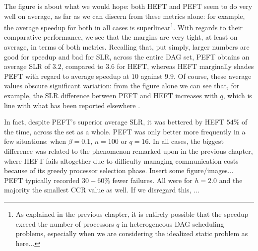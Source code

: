 \documentclass[12pt]{article}
\begin{document}
      The figure is about what we would hope: both HEFT and PEFT seem to do very well on average, as far as we can discern from these metrics alone: for example, the average speedup for both in all cases is superlinear\footnote{As explained in the previous chapter, it is entirely possible that the speedup exceed the number of processors $q$ in heterogeneous DAG scheduling problems, especially when we are considering the idealized static problem as here...}. With regards to their comparative performance, we see that the margins are very tight, at least on average, in terms of both metrics. Recalling that, put simply, larger numbers are good for speedup and bad for SLR, across the entire DAG set, PEFT obtains an average SLR of $3.2$, compared to $3.6$ for HEFT, whereas HEFT marginally shades PEFT with regard to average speedup at $10$ against $9.9$. Of course, these average values obscure significant variation: from the figure alone we can see that, for example, the SLR difference between PEFT and HEFT increases with $q$, which is line with what has been reported elsewhere \cite{arabnejad14}.

In fact, despite PEFT's superior average SLR, it was bettered by HEFT $54\%$ of the time, across the set as a whole. PEFT was only better more frequently in a few situations: when $\beta = 0.1$, $n = 100$ or $q = 16$. In all cases, the biggest difference was related to the phenomenon remarked upon in the previous chapter, where HEFT fails altogether due to difficulty managing communication costs because of its greedy processor selection phase. Insert some figure/images... PEFT typically recorded $30-60\%$ fewer failures. All were for $h = 2.0$ and the majority the smallest CCR value as well. If we disregard this, ...  




\end{document}
